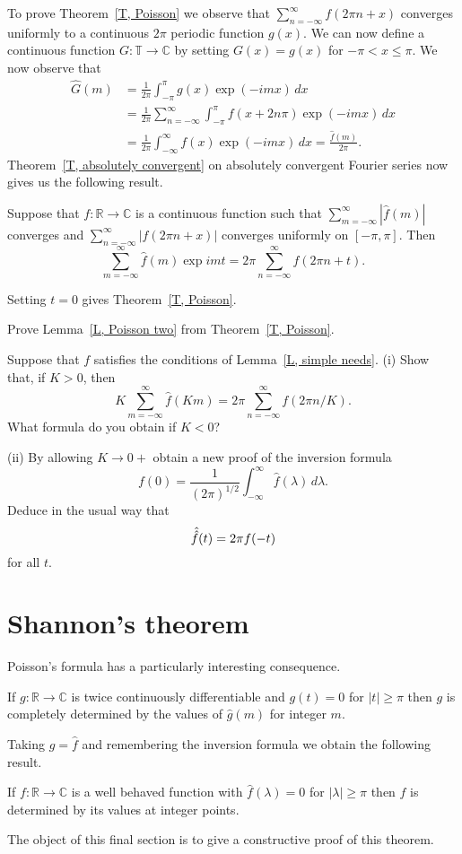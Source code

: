 To prove Theorem~\ref{T, Poisson} we observe that
$\sum_{n=-\infty}^{\infty}f(2\pi n+x)$ converges uniformly
to a continuous $2\pi$ periodic function $g(x)$.
We can now define a continuous function $G:{\mathbb T}\rightarrow{\mathbb C}$
by setting $G(x)=g(x)$ for $-\pi<x\leq \pi$. We now observe that
\begin{align*}
\hat{G}(m)&=\frac{1}{2\pi}\int_{-\pi}^{\pi}g(x)\exp(-imx)\,dx\\
&=\frac{1}{2\pi}\sum_{n=-\infty}^{\infty}
\int_{-\pi}^{\pi}f(x+2n\pi)\exp(-imx)\,dx\\
&=\frac{1}{2\pi}\int_{-\infty}^{\infty}f(x)\exp(-imx)\,dx
=\frac{\hat{f}(m)}{2\pi}.
\end{align*}
Theorem~\ref{T, absolutely convergent} on absolutely convergent
Fourier series now gives us the following result.
\begin{lemma}\label{L, Poisson two}
Suppose that
$f:{\mathbb R}\rightarrow{\mathbb C}$ is a continuous
function such that $\sum_{m=-\infty}^{\infty}|\hat{f}(m)|$
converges and $\sum_{n=-\infty}^{\infty}|f(2\pi n+x)|$
converges uniformly on $[-\pi,\pi]$. Then
\[\sum_{m=-\infty}^{\infty}\hat{f}(m)\exp imt=
2\pi\sum_{n=-\infty}^{\infty}f(2\pi n+t).\]
\end{lemma}
Setting $t=0$ gives Theorem~\ref{T, Poisson}.
\begin{exercise}\label{E, Poisson both ways}
Prove Lemma~\ref{L, Poisson two} from
Theorem~\ref{T, Poisson}.
\end{exercise}
\begin{exercise}\label{E invers via Poisson}
Suppose that $f$ satisfies the conditions
of Lemma~\ref{L, simple needs}.
(i) Show that, if $K>0$, then
\[K\sum_{m=-\infty}^{\infty}\hat{f}(Km)=
2\pi\sum_{n=-\infty}^{\infty}f(2\pi n/K).\]
What formula do you obtain if $K<0$?

(ii) By allowing $K\rightarrow 0+$ obtain a new proof
of the inversion formula
\[f(0)=\frac{1}{(2\pi)^{1/2}}
\int_{-\infty}^{\infty}\hat{f}(\lambda)\,d\lambda.\]
Deduce in the usual way that
\[\Hat{\Hat{f}}(t)=2\pi f(-t)\]
for all $t$.
\end{exercise}
\section{Shannon's theorem}
Poisson's formula has a particularly interesting consequence.
\begin{lemma} If $g:{\mathbb R}\rightarrow{\mathbb C}$
is twice continuously differentiable and
$g(t)=0$ for $|t|\geq \pi$ then $g$ is completely
determined by the values of $\hat{g}(m)$ for
integer $m$.
\end{lemma}
Taking $g=\hat{f}$ and remembering the inversion formula
we obtain the following result.
\begin{theorem}\label{before Shannon}
If $f:{\mathbb R}\rightarrow{\mathbb C}$
is a well behaved function with $\hat{f}(\lambda)=0$
for $|\lambda|\geq\pi$
then $f$ is determined by its values at integer
points.
\end{theorem}
The object of this final section is to give a constructive
proof of this theorem.

